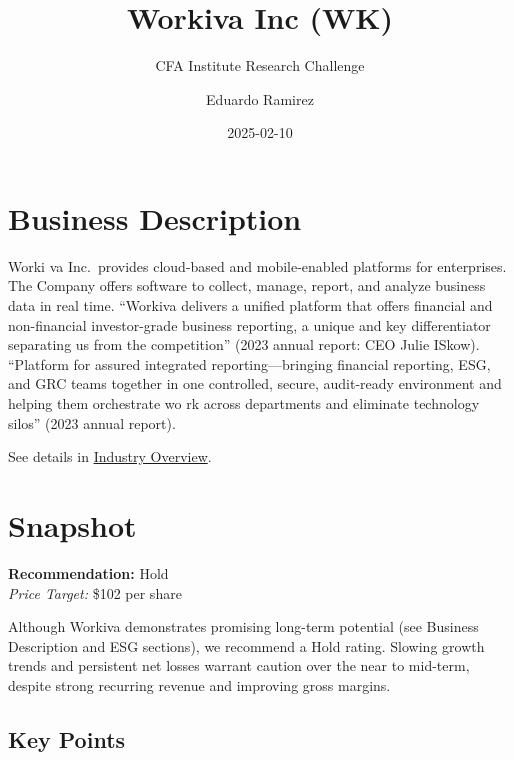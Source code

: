 \documentclass[
  10pt,
  a4paper,
]{article}
\title{Workiva Inc (WK)}
\subtitle{CFA Institute Research Challenge}
\author{Eduardo Ramirez}
\date{2025-02-10}
\begin{document}
\maketitle


\section{Business Description}\label{business-description}

Worki va Inc.~provides cloud-based and mobile-enabled platforms for
enterprises. The Company offers software to collect, manage, report, and
analyze business data in real time. ``Workiva delivers a unified
platform that offers financial and non-financial investor-grade business
reporting, a unique and key differentiator separating us from the
competition'' (2023 annual report: CEO Julie ISkow). ``Platform for
assured integrated reporting---bringing financial reporting, ESG, and
GRC teams together in one controlled, secure, audit-ready environment
and helping them orchestrate wo rk across departments and eliminate
technology silos'' (2023 annual report).

See details in
\hyperref[industry-overview-competitive-positioning]{Industry Overview}.

\section{Snapshot}\label{snapshot}

\begin{tcolorbox}[enhanced jigsaw, colframe=quarto-callout-note-color-frame, colback=white, opacityback=0, bottomrule=.15mm, leftrule=.75mm, arc=.35mm, rightrule=.15mm, toprule=.15mm, left=2mm, breakable]

\textbf{Recommendation:} Hold\\
\emph{Price Target:} \$102 per share

\end{tcolorbox}

Although Workiva demonstrates promising long-term potential (see
Business Description and ESG sections), we recommend a Hold rating.
Slowing growth trends and persistent net losses warrant caution over the
near to mid-term, despite strong recurring revenue and improving gross
margins.

\subsection{Key Points}\label{key-points}
\end{document}
